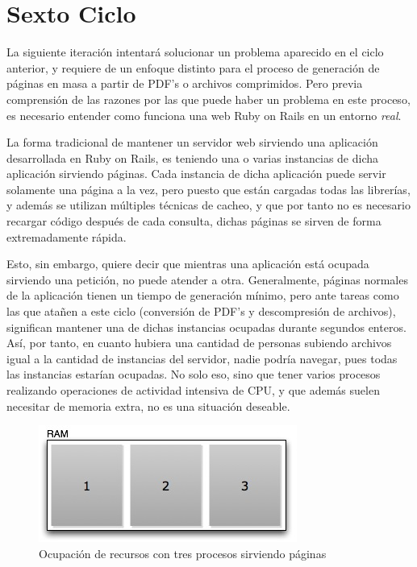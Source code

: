 \section{Sexto Ciclo} %
\label{sec:sexto_ciclo}

La siguiente iteración intentará solucionar un problema aparecido en el ciclo anterior, y requiere de un enfoque distinto para el proceso de generación de páginas en masa a partir de PDF's o archivos comprimidos. Pero previa comprensión de las razones por las que puede haber un problema en este proceso, es necesario entender como funciona una web Ruby on Rails en un entorno \emph{real}.

La forma tradicional de mantener un servidor web sirviendo una aplicación desarrollada en Ruby on Rails, es teniendo una o varias instancias de dicha aplicación sirviendo páginas. Cada instancia de dicha aplicación puede servir solamente una página a la vez, pero puesto que están cargadas todas las librerías, y además se utilizan múltiples técnicas de cacheo, y que por tanto no es necesario recargar código después de cada consulta, dichas páginas se sirven de forma extremadamente rápida.

Esto, sin embargo, quiere decir que mientras una aplicación está ocupada sirviendo una petición, no puede atender a otra. Generalmente, páginas normales de la aplicación tienen un tiempo de generación mínimo, pero ante tareas como las que atañen a este ciclo (conversión de PDF's y descompresión de archivos), significan mantener una de dichas instancias ocupadas durante segundos enteros. Así, por tanto, en cuanto hubiera una cantidad de personas subiendo archivos igual a la cantidad de instancias del servidor, nadie podría navegar, pues todas las instancias estarían ocupadas. No solo eso, sino que tener varios procesos realizando operaciones de actividad intensiva de CPU, y que además suelen necesitar de memoria extra, no es una situación deseable.

\begin{figure}[h!]
\centering
\includegraphics{ram1.jpg}
\caption{Ocupación de recursos con tres procesos sirviendo páginas}\label{fig:ram1}
\end{figure}

